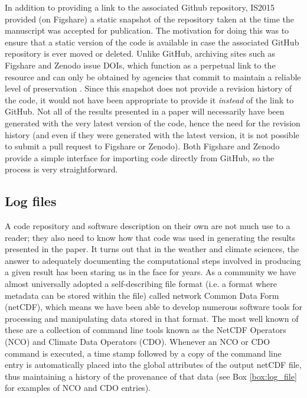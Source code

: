 In addition to providing a link to the associated Github repository, IS2015 provided (on Figshare) a static snapshot of the repository taken at the time the manuscript was accepted for publication. The motivation for doing this was to ensure that a static version of the code is available in case the associated GitHub repository is ever moved or deleted. Unlike GitHub, archiving sites such as Figshare and Zenodo issue DOIs, which function as a perpetual link to the resource and can only be obtained by agencies that commit to maintain a reliable level of preservation \citep{Potter2015}. Since this snapshot does not provide a revision history of the code, it would not have been appropriate to provide it \textit{instead} of the link to GitHub. Not all of the results presented in a paper will necessarily have been generated with the very latest version of the code, hence the need for the revision history (and even if they were generated with the latest version, it is not possible to submit a pull request to Figshare or Zenodo). Both Figshare and Zenodo provide a simple interface for importing code directly from GitHub, so the process is very straightforward.

\subsection{Log files}\label{s:log_files}

A code repository and software description on their own are not much use to a reader; they also need to know how that code was used in generating the results presented in the paper. It turns out that in the weather and climate sciences, the answer to adequately documenting the computational steps involved in producing a given result has been staring us in the face for years. As a community we have almost universally adopted a self-describing file format (i.e. a format where metadata can be stored within the file) called network Common Data Form (netCDF), which means we have been able to develop numerous software tools for processing and manipulating data stored in that format. The most well known of these are a collection of command line tools known as the NetCDF Operators (NCO) and Climate Data Operators (CDO). Whenever an NCO or CDO command is executed, a time stamp followed by a copy of the command line entry is automatically placed into the global attributes of the output netCDF file, thus maintaining a history of the provenance of that data (see Box \ref{box:log_file} for examples of NCO and CDO entries).

